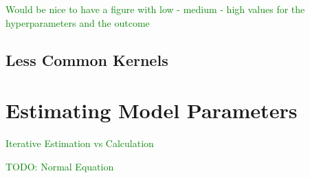 \textcolor{green}{Would be nice to have a figure with low - medium - high values for the hyperparameters and the outcome}


\subsection{Less Common Kernels}










\section{Estimating Model Parameters}

\textcolor{green}{Iterative Estimation vs Calculation}

\textcolor{green}{TODO: Normal Equation}
















